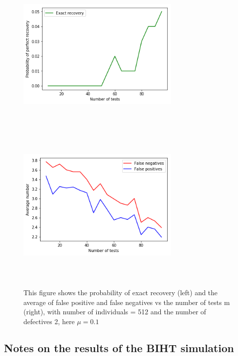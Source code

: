 \begin{figure}[H]
	\includegraphics[height=8cm, width=8cm]{images/exa_mu}
	\includegraphics[height=8cm, width=8cm]{images/fal_mu}
	\caption{This figure shows the probability of exact recovery (left) and  the average of false positive and false negatives vs the number of tests m (right), with number of individuals  = 512 and the number of defectives 2, here $ \mu = 0.1 $}
	\label{mu}
\end{figure}


\subsection{Notes on the results of the BIHT simulation} 


